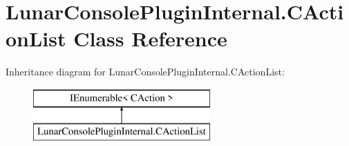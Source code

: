 \hypertarget{class_lunar_console_plugin_internal_1_1_c_action_list}{}\section{Lunar\+Console\+Plugin\+Internal.\+C\+Action\+List Class Reference}
\label{class_lunar_console_plugin_internal_1_1_c_action_list}
Inheritance diagram for Lunar\+Console\+Plugin\+Internal.\+C\+Action\+List\+:\begin{figure}[H]
\begin{center}
\leavevmode
\includegraphics[height=2.000000cm]{class_lunar_console_plugin_internal_1_1_c_action_list}
\end{center}
\end{figure}
